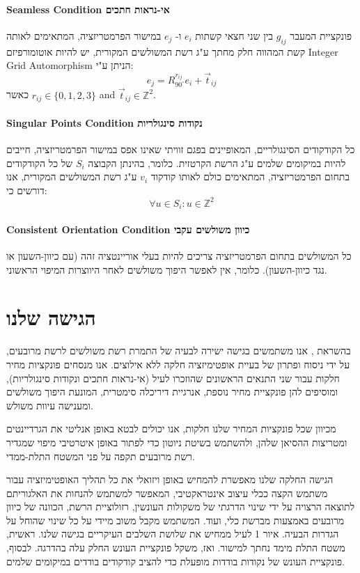 \documentclass{article}
\begin{document}
\paragraph{\foreignlanguage{english}{Seamless Condition} אי-נראות חתכים}
פונקציית המעבר
$ g_ {ij} $
בין שני חצאי קשתות
$ e_i $
ו-
$ e_j $
במישור הפרמטריזציה, המתאימים לאותה קשת המהווה חלק מחתך ע"ג רשת המשולשים המקורית, יש להיות אוטומורפיזם
\foreignlanguage{english}{Integer Grid Automorphism}
הניתן ע"י:
$$e_j = R^{r_{ij}}_{90^\circ}e_i + \vec{t}_{ij}$$
  כאשר
$r_{ij} \in \{0,1,2,3\}$ and $\vec{t}_{ij} \in \mathbb{Z}^2$.

\paragraph{\foreignlanguage{english}{Singular Points Condition} נקודות סינגולריות}
כל הקודקודים הסינגולריים, המאופיינים בפגם
זוויתי שאינו אפס במישור הפרמטריזציה, חייבים
להיות במיקומים שלמים ע"ג הרשת הקרטזית.
כלומר, בהינתן הקבוצה
$S_i$
של כל הקודקודים בתחום הפרמטריזציה, המתאימים כולם לאותו קודקוד
$v_i$
ע"ג רשת המשולשים המקורית, אנו דורשים כי:
$$\forall u \in S_i: u \in \mathbb{Z}^2 $$

\paragraph{\foreignlanguage{english}{Consistent Orientation Condition} כיוון משולשים עקבי}
כל המשולשים בתחום הפרמטריזציה צריכים להיות בעלי אוריינטציה זהה (עם כיוון-השעון או נגד כיוון-השעון). כלומר, אין לאפשר היפוך משולשים לאחר היווצרות המיפוי הראשוני.

\section{הגישה שלנו}
בהשראת \cite{Poranne:Autocuts:2017}, אנו משתמשים בגישה ישירה לבעיה של התמרת רשת משולשים לרשת מרובעים, על ידי ניסוח ופתרון של בעיית אופטימיזציה חלקה ללא אילוצים. אנו מנסחים פונקציות מחיר חלקות עבור שני התנאים הראשונים שהוזכרו לעיל (אי-נראות חתכים ונקודות סינגולריות), ומוסיפים להן פונקציית מחיר נוספת, אנרגיית דיריכלה סימטרית, המונעת היפוך משולשים ומענישה עיוות משולש.

מכיוון שכל פונקציות המחיר שלנו חלקות, אנו יכולים לבטא באופן אנליטי את הגרדיינטים ומטריצות ההסיאן שלהן, ולהשתמש בשיטת ניוטון כדי לפתור באופן איטרטיבי מיפוי שמגדיר רשת מרובעים תקפה על פני המשטח התלת-ממדי.

הגישה החלקה שלנו מאפשרת להמחיש באופן ויזואלי את כל תהליך האופטימיזציה עבור משתמש הקצה ככלי עיצוב אינטראקטיבי, המאפשר למשתמש להנחות את האלגוריתם לתוצאה הרצויה על ידי שינוי הדרגתי של משקולות העונשין, רזולוציית הרשת, הכוונה של כיוון מרובעים באמצעות מברשת כלי, ועוד. המשתמש מקבל משוב מיידי על כל שינוי שהוחל על הגדרות הבעיה. איור
1 לעיל
ממחיש את שלושת השלבים העיקריים בגישה שלנו. ראשית, משטח התלת מימד נחתך למישור. ואז, משקל פונקציית העונש החלק עלה בהדרגה. לבסוף, פונקציית העונש של נקודות בודדות מופעלת כדי להציב קודקודים בודדים במיקומים שלמים.
\end{document}
